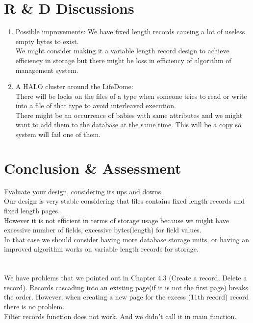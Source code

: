 \documentclass{article}
\begin{document}
\section{R \& D Discussions}
\begin{enumerate}
     \item Possible improvements: We have fixed length records causing a lot of useless empty bytes to exist.\\ We might consider making it a variable length record design to achieve efficiency in storage but there might be loss in efficiency of algorithm of management system.
     \item A HALO cluster around the LifeDome: \\
     There will be locks on the files of a type when someone tries to read or write into a file of that type to avoid interleaved execution.\\ There might be an occurrence of babies with same attributes and we might want to add them to the database at the same time. This will be a copy so system will fail one of them. \\ 
\end{enumerate}

\section{Conclusion \& Assessment}
\label{sec:conclusion}
Evaluate your design, considering its ups and downs. 
\\ Our design is very stable considering that files contains fixed length records and fixed length pages.\\ However it is not efficient in terms of storage usage because we might have excessive number of fields, excessive bytes(length) for field values. \\ In that case we should consider having more database storage units, or having an improved algorithm works on variable length records for storage.\\ \\ \\
We have problems that we pointed out in Chapter 4.3 (Create a record, Delete a record). Records cascading into an existing page(if it is not the first page) breaks the order. However, when creating a new page for the excess (11th record) record there is no problem.\\
Filter records function does not work. And we didn't call it in main function.\\
\end{document}
